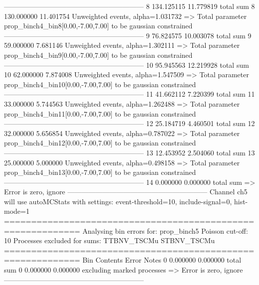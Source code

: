 ------------------------------------------------------------
8          134.125115      11.779819       total sum                     
8          130.000000      11.401754       Unweighted events, alpha=1.031732
  => Total parameter prop_binch4_bin8[0.00,-7.00,7.00] to be gaussian constrained
------------------------------------------------------------
9          76.824575       10.003078       total sum                     
9          59.000000       7.681146        Unweighted events, alpha=1.302111
  => Total parameter prop_binch4_bin9[0.00,-7.00,7.00] to be gaussian constrained
------------------------------------------------------------
10         95.945563       12.219928       total sum                     
10         62.000000       7.874008        Unweighted events, alpha=1.547509
  => Total parameter prop_binch4_bin10[0.00,-7.00,7.00] to be gaussian constrained
------------------------------------------------------------
11         41.662112       7.220399        total sum                     
11         33.000000       5.744563        Unweighted events, alpha=1.262488
  => Total parameter prop_binch4_bin11[0.00,-7.00,7.00] to be gaussian constrained
------------------------------------------------------------
12         25.184719       4.460501        total sum                     
12         32.000000       5.656854        Unweighted events, alpha=0.787022
  => Total parameter prop_binch4_bin12[0.00,-7.00,7.00] to be gaussian constrained
------------------------------------------------------------
13         12.453952       2.504060        total sum                     
13         25.000000       5.000000        Unweighted events, alpha=0.498158
  => Total parameter prop_binch4_bin13[0.00,-7.00,7.00] to be gaussian constrained
------------------------------------------------------------
14         0.000000        0.000000        total sum                     
  => Error is zero, ignore      
------------------------------------------------------------
Channel ch5 will use autoMCStats with settings: event-threshold=10, include-signal=0, hist-mode=1
============================================================
Analysing bin errors for: prop_binch5
Poisson cut-off: 10
Processes excluded for sums: TTBNV_TSCMu STBNV_TSCMu
============================================================
Bin        Contents        Error           Notes                         
0          0.000000        0.000000        total sum                     
0          0.000000        0.000000        excluding marked processes    
  => Error is zero, ignore      
------------------------------------------------------------
